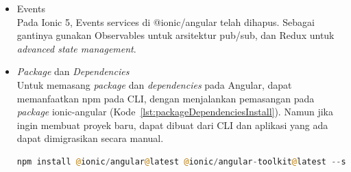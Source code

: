 \begin{enumerate}
\begin{itemize}
		\item Events \\
		Pada Ionic 5, Events services di @ionic/angular telah dihapus. Sebagai gantinya gunakan Observables untuk arsitektur pub/sub, dan Redux untuk {\it advanced state management}.
		
		\item {\it Package} dan {\it Dependencies} \\
		Untuk memasang {\it package} dan {\it dependencies} pada Angular, dapat memanfaatkan npm pada CLI, dengan menjalankan pemasangan pada {\it package} ionic-angular  (Kode~\ref{lst:packageDependenciesInstall}). Namun jika ingin membuat proyek baru, dapat dibuat dari CLI dan aplikasi yang ada dapat dimigrasikan secara manual.
		\begin{lstlisting}[language=php, label={lst:packageDependenciesInstall}, caption=Kode untuk Memasang {\it Package} dan {\it Dependencies} pada Angular]
			npm install @ionic/angular@latest @ionic/angular-toolkit@latest --save
		\end{lstlisting} 
	\end{itemize}


\end{enumerate}




%



